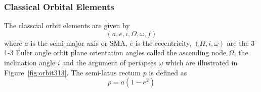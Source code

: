 \subsubsection{Classical Orbital Elements}
The classcial orbit elements are given by 
$$
	(a, e, i, \Omega, \omega, f)
$$
where $a$ is the semi-major axis or SMA, $e$ is the eccentricity, $(\Omega, i, \omega)$ are the 3-1-3 Euler angle orbit plane orientation angles called the ascending node $\Omega$, the inclination angle $i$ and the argument of periapses $\omega$ which are illustrated in Figure~\ref{fig:orbit313}.   The semi-latus rectum $p$ is defined as
\begin{equation}
	p = a (1-e^{2})
\end{equation}
\begin{figure}[t]
	\centering
	\\	

\end{figure}
